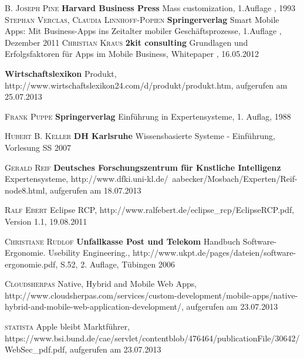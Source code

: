 \begin{thebibliography}{---}
             \textsc{B. Joseph Pine}
            \textbf{Harvard Business Press}
            Mass customization, 1.Auflage , 1993
             \textsc{Stephan Verclas, Claudia Linnhoff-Popien}
            \textbf{Springerverlag}
            Smart Mobile Apps: Mit Business-Apps ins Zeitalter mobiler Geschäftsprozesse, 1.Auflage , Dezember 2011
             \textsc{Christian Kraus}
            \textbf{2kit consulting}
            Grundlagen und Erfolgsfaktoren 
            für Apps im Mobile Business, Whitepaper , 16.05.2012

            \textbf{Wirtschaftslexikon}
            Produkt, http://www.wirtschaftslexikon24.com/d/produkt/produkt.htm, aufgerufen am 25.07.2013
            
 			 \textsc{Frank Puppe}
 			 \textbf{Springerverlag}
 			 Einführung in Expertensysteme, 1. Auflag, 1988
 			 
  			 \textsc{Hubert B. Keller}
  			 \textbf{DH Karlsruhe}
  			 Wissensbasierte Systeme - Einführung, Vorlesung SS 2007
  			 
             \textsc{Gerald Reif}
            \textbf{Deutsches Forschungszentrum für Knstliche Intelligenz}
            Expertensysteme, http://www.dfki.uni-kl.de/~aabecker/Mosbach/Experten/Reif-node8.html, aufgerufen am 18.07.2013
            
               \textsc{Ralf Ebert}
              Eclipse RCP, http://www.ralfebert.de/eclipse\_rcp/EclipseRCP.pdf, Version 1.1, 19.08.2011
  			
 			
           \textsc{Christiane Rudlof}
          \textbf{Unfallkasse Post und Telekom}
          Handbuch Software-Ergonomie. Usebility Engineering., http://www.ukpt.de/pages/dateien/software-ergonomie.pdf, S.52, 2. Auflage, Tübingen 2006

           \textsc{Cloudsherpas}
          Native, Hybrid and Mobile Web Apps, http://www.cloudsherpas.com/services/custom-development/mobile-apps/native-hybrid-and-mobile-web-application-development/, aufgerufen am 23.07.2013

           \textsc{statista}
          Apple bleibt Marktführer, https://www.bsi.bund.de/cae/servlet/contentblob/476464/publicationFile/30642/WebSec\_pdf.pdf, aufgerufen am 23.07.2013
          

\end{thebibliography}
